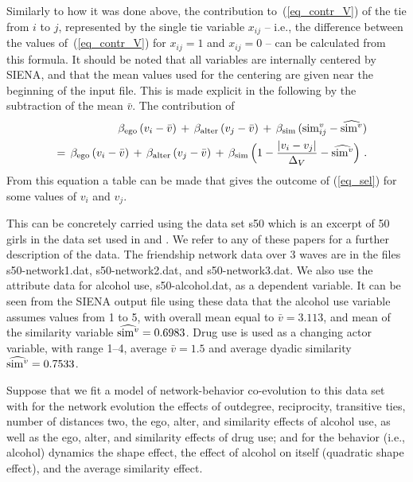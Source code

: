 \documentclass[a4paper,fleqn]{article}
\newcommand{\+}{\, + \,}
\newcommand{\SI}{{\sf SIENA }}
\newcommand{\si}{{\sf SIENA}}
\begin{document}
{Similarly to how it was done above, the contribution to~(\ref{eq_contr_V})
of the tie from $i$ to $j$, represented by the
single tie variable $x_{ij}$ -- i.e., the difference
between the values of~(\ref{eq_contr_V}) for $x_{ij}=1$
and $x_{ij}=0$  --  can be calculated from this formula.
It should be noted that all variables are internally centered by \si,
and that the mean values used for the centering
are given near the beginning of the input file.
This is made explicit in the following by the subtraction
of the mean $\bar v$. The contribution of
\begin{eqnarray}
  & & \beta_{\rm ego}\, (v_i - \bar v)  \, + \, \beta_{\rm alter}\,  (v_j - \bar v) \, + \,
        \beta_{\rm sim} \, ({\rm sim}^v_{ij} - \widehat{{\rm sim}^v} ) \nonumber \\
 && = \, \beta_{\rm ego}\, (v_i - \bar v)  \, + \, \beta_{\rm alter}\,  (v_j - \bar v) \, + \,
        \beta_{\rm sim} \,  \Big( 1 - \frac{\vert v_i - v_j \vert}{\Delta_V} - \widehat{{\rm sim}^v} \Big) \ .
                 \label{eq_sel}
\end{eqnarray}
From this equation a table can be made that gives the
outcome of (\ref{eq_sel}) for some values of $v_i$ and $v_j$.


This can be concretely carried using the data set {\sf s50}
which is an excerpt of 50 girls in the data set used in
\citet{PearsonMichell00, PearsonWest03,
SteglichEA06} and \citet{SteglichEA10}.
We refer to any of these papers for a further description of the data.
The friendship network data over 3 waves are in
the files {\sf s50-network1.dat}, {\sf s50-network2.dat},
and {\sf s50-network3.dat}.
We also use the attribute data
for alcohol use, {\sf s50-alcohol.dat}, as a dependent variable.
It can be seen from the \SI output file using these data that
the alcohol use variable assumes values from 1 to 5, with overall mean
equal to $\bar v = 3.113$, and mean of the similarity variable $\widehat{{\rm sim}^v} = 0.6983$.
Drug use is used as a changing actor variable, with
range 1--4, average $\bar v = 1.5$ and average dyadic similarity $\widehat{{\rm sim}^v} = 0.7533$.

Suppose that we fit a model of network-behavior co-evolution to this data set
with for the network evolution the effects of outdegree, reciprocity,
transitive ties, number of distances two,
the ego, alter, and similarity effects of alcohol use,
as well as the ego, alter, and similarity effects of drug use;
and for the behavior (i.e., alcohol) dynamics
the shape effect,
the effect of alcohol on itself (quadratic shape effect),
and the average similarity effect.

}
\end{document}
